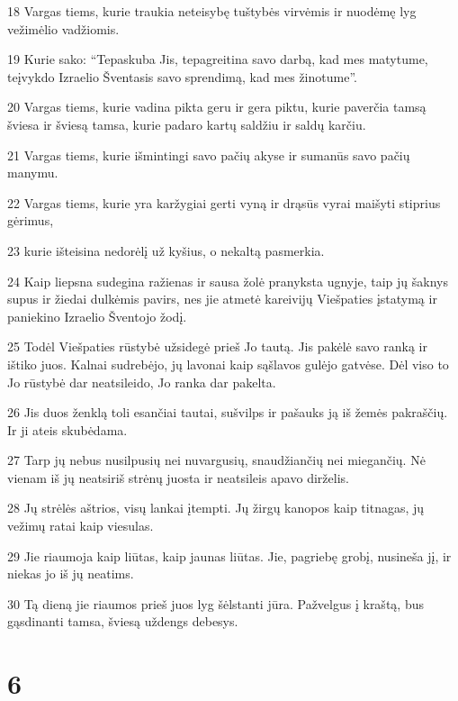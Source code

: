 \par 18 Vargas tiems, kurie traukia neteisybę tuštybės virvėmis ir nuodėmę lyg vežimėlio vadžiomis. 
\par 19 Kurie sako: “Tepaskuba Jis, tepagreitina savo darbą, kad mes matytume, teįvykdo Izraelio Šventasis savo sprendimą, kad mes žinotume”. 
\par 20 Vargas tiems, kurie vadina pikta geru ir gera piktu, kurie paverčia tamsą šviesa ir šviesą tamsa, kurie padaro kartų saldžiu ir saldų karčiu. 
\par 21 Vargas tiems, kurie išmintingi savo pačių akyse ir sumanūs savo pačių manymu. 
\par 22 Vargas tiems, kurie yra karžygiai gerti vyną ir drąsūs vyrai maišyti stiprius gėrimus, 
\par 23 kurie išteisina nedorėlį už kyšius, o nekaltą pasmerkia. 
\par 24 Kaip liepsna sudegina ražienas ir sausa žolė pranyksta ugnyje, taip jų šaknys supus ir žiedai dulkėmis pavirs, nes jie atmetė kareivijų Viešpaties įstatymą ir paniekino Izraelio Šventojo žodį. 
\par 25 Todėl Viešpaties rūstybė užsidegė prieš Jo tautą. Jis pakėlė savo ranką ir ištiko juos. Kalnai sudrebėjo, jų lavonai kaip sąšlavos gulėjo gatvėse. Dėl viso to Jo rūstybė dar neatsileido, Jo ranka dar pakelta. 
\par 26 Jis duos ženklą toli esančiai tautai, sušvilps ir pašauks ją iš žemės pakraščių. Ir ji ateis skubėdama. 
\par 27 Tarp jų nebus nusilpusių nei nuvargusių, snaudžiančių nei miegančių. Nė vienam iš jų neatsiriš strėnų juosta ir neatsileis apavo dirželis. 
\par 28 Jų strėlės aštrios, visų lankai įtempti. Jų žirgų kanopos kaip titnagas, jų vežimų ratai kaip viesulas. 
\par 29 Jie riaumoja kaip liūtas, kaip jaunas liūtas. Jie, pagriebę grobį, nusineša jį, ir niekas jo iš jų neatims. 
\par 30 Tą dieną jie riaumos prieš juos lyg šėlstanti jūra. Pažvelgus į kraštą, bus gąsdinanti tamsa, šviesą uždengs debesys.



\chapter{6}


